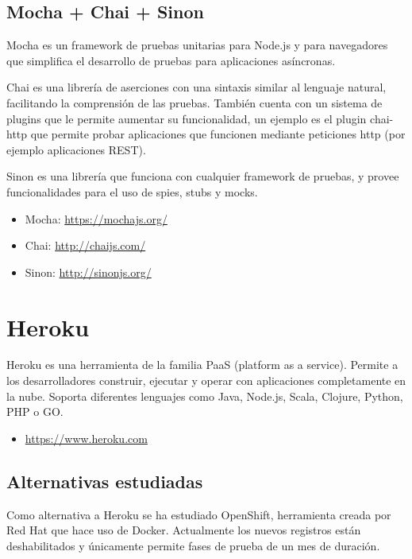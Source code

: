 \subsection{Mocha + Chai + Sinon}

Mocha es un framework de pruebas unitarias para Node.js y para navegadores que simplifica el desarrollo de pruebas para aplicaciones asíncronas.

Chai es una librería de aserciones con una sintaxis similar al lenguaje natural, facilitando la comprensión de las pruebas. También cuenta con un sistema de plugins que le permite aumentar su funcionalidad, un ejemplo es el plugin chai-http que permite probar aplicaciones que funcionen mediante peticiones http (por ejemplo aplicaciones REST).

Sinon es una librería que funciona con cualquier framework de pruebas, y provee funcionalidades para el uso de spies, stubs y mocks. 

\begin{itemize}
	\item Mocha: \url{https://mochajs.org/}
	\item Chai: \url{http://chaijs.com/}
	\item Sinon: \url{http://sinonjs.org/}
\end{itemize}

\section{Heroku}

Heroku es una herramienta de la familia PaaS (platform as a service). Permite a los desarrolladores construir, ejecutar y operar con aplicaciones completamente en la nube. Soporta diferentes lenguajes como Java, Node.js, Scala, Clojure, Python, PHP o GO.

\begin{itemize}
	\item \url{https://www.heroku.com}
\end{itemize}

\subsection{Alternativas estudiadas}

Como alternativa a Heroku se ha estudiado OpenShift, herramienta creada por Red Hat que hace uso de Docker. Actualmente los nuevos registros están deshabilitados y únicamente permite fases de prueba de un mes de duración.

